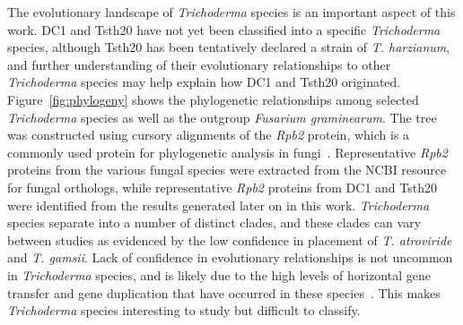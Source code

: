 The evolutionary landscape of \textit{Trichoderma} species is an important aspect of this work. DC1 and Tsth20 have not yet been classified into a specific \textit{Trichoderma} species, although Tsth20 has been tentatively declared a strain of \textit{T. harzianum}, and further understanding of their evolutionary relationships to other \textit{Trichoderma} species may help explain how DC1 and Tsth20 originated. 
Figure~\ref{fig:phylogeny} shows the phylogenetic relationships among selected \textit{Trichoderma} species as well as the outgroup \textit{Fusarium graminearum}. The tree was constructed using cursory alignments of the \textit{Rpb2} protein, which is a commonly used protein for phylogenetic analysis in fungi~\cite{an2022}. Representative \textit{Rpb2} proteins from the various fungal species were extracted from the NCBI resource for fungal orthologs, while representative \textit{Rpb2} proteins from DC1 and Tsth20 were identified from the results generated later on in this work. \textit{Trichoderma} species separate into a number of distinct clades, and these clades can vary between studies as evidenced by the low confidence in placement of \textit{T. atroviride} and \textit{T. gamsii}. Lack of confidence in evolutionary relationships is not uncommon in \textit{Trichoderma} species, and is likely due to the high levels of horizontal gene transfer and gene duplication that have occurred in these species~\cite{goncalves2024}. This makes \textit{Trichoderma} species interesting to study but difficult to classify. 

